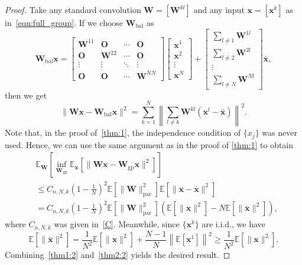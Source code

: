 \documentclass[10pt,a4paper]{amsart}
\numberwithin{equation}{section}
\theoremstyle{remark}
\newcommand\bO{\mathbf{O}}
\newcommand\bW{\mathbf{W}}
\newcommand\bx{\mathbf{x}}
\newcommand\bbE{\mathbb{E}}
\newcommand\gp{\mathrm{gp}}
\newcommand\bal{\mathrm{bal}}
\newcommand\param{\mathrm{par}}
\begin{document}
\begin{proof}
Take any standard convolution $\bW = [\bW^{kl}]$ and any input $\bx = [\bx^k]$ as in~\eqref{eqn:full_group}.
If we choose $\bW_{\bal}$ as
\begin{equation*}
    \bW_{\bal} \bx
    =
    \begin{bmatrix} \bW^{11} & \bO & \cdots & \bO \\
        \bO & \bW^{22} & \cdots & \bO \\
        \vdots & \vdots & \ddots & \vdots \\
        \bO & \bO & \cdots & \bW^{NN} \end{bmatrix}
    \begin{bmatrix} \bx^1 \\ \bx^2 \\ \vdots \\ \bx^N \end{bmatrix}
    + \begin{bmatrix} \sum_{l \neq 1} \bW^{1l} \\ \sum_{l \neq 2} \bW^{2l} \\ \vdots \\ \sum_{l \neq N} \bW^{Nl} \end{bmatrix}
    \bar{\bx},
\end{equation*}
then we get
\begin{equation*}
    \| \bW \bx - \bW_{\bal} \bx \|^2 = \sum_{k=1}^N \left\| \sum_{l \neq k} \bW^{kl} (\bx^l - \bar{\bx}) \right\|^2.
\end{equation*}
Note that, in the proof of~\cref{thm:1}, the independence condition of $\{ x_j \}$ was never used.
Hence, we can use the same argument as in the proof of \cref{thm:1} to obtain
\begin{equation}
\label{thm1:2}
    \begin{split}
        &\bbE_{\bW} \left[ \inf_{\bW_{\gp}} \bbE_{\bx} \left[ \| \bW \bx - \bW_{\gp} \bx \|^2 \right] \right] \\
        &\leq C_{n,N,k} \left( 1 - \frac{1}{N} \right)^2 \bbE \left[ \| \bW \|_{\param}^2 \right] \bbE \left[ \| \bx - \bar{\bx }\|^2 \right] \\
        &= C_{n,N,k} \left( 1 - \frac{1}{N} \right)^2 \bbE \left[ \| \bW \|_{\param}^2 \right] \left( \bbE \left[ \| \bx \|^2 \right] - N \bbE \left[ \| \bar{\bx} \|^2 \right] \right),
    \end{split}
\end{equation}
where $C_{n,N,k}$ was given in~\eqref{C}.
Meanwhile, since $\{ \bx^k \}$ are i.i.d., we have
\begin{equation}
\label{thm2:2}
    \bbE \left[ \| \bar{\bx} \|^2 \right] = \frac{1}{N^2} \bbE \left[ \| \bx \|^2 \right] + \frac{N-1}{N} \left\| \bbE \left[ \bx^1 \right] \right\|^2
    \geq \frac{1}{N^2} \bbE \left[ \| \bx \|^2 \right].
\end{equation}
Combining~\eqref{thm1:2} and~\eqref{thm2:2} yields the desired result.
\end{proof}
\end{document}
